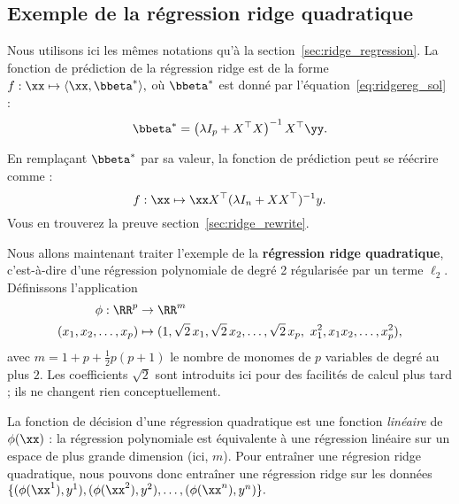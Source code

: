\subsection{Exemple de la régression ridge quadratique}

Nous utilisons ici les mêmes notations qu'à la section~\ref{sec:ridge_regression}.
La fonction de prédiction de la régression ridge est de la forme
  $f: \xx \mapsto \langle \xx,  \bbeta^* \rangle,$
où $\bbeta^*$ est donné par l'équation~\eqref{eq:ridgereg_sol} :
\begin{equation}
  \label{eq:reg_ridge_beta}
  \bbeta^* =  \left( \lambda I_p + X^\top X  \right)^{-1} X^\top \yy.
\end{equation}
  
En remplaçant $\bbeta^*$ par sa valeur, la fonction de prédiction peut se réécrire comme :
\begin{equation}
  \label{eq:reg_ridge_2}
  f: \xx \mapsto \xx X^\top (\lambda I_n + XX^\top)^{-1} y.
\end{equation}
Vous en trouverez la preuve section~\ref{sec:ridge_rewrite}.


Nous allons maintenant traiter l'exemple de la \textbf{régression ridge
  quadratique}, c'est-à-dire d'une régression polynomiale de degré 2
régularisée par un terme $\ell_2$. 
Définissons l'application
\begin{equation*}
  \begin{split}
    \phi: \RR^p  & \to \RR^m \\
    (x_1, x_2, \dots, x_p) & \mapsto (1, \sqrt{2}\,x_1, \sqrt{2}\, x_2, \dots,
    \sqrt{2}\, x_p,~x_1^2, x_1 x_2, \dots, x_p^2),
  \end{split}
\end{equation*}
avec $m = 1+ p + \frac12 p(p+1)$ le nombre de monomes de $p$ variables de degré
au plus $2$.  Les coefficients $\sqrt{2}$ sont introduits ici pour des
facilités de calcul plus tard ; ils ne changent rien conceptuellement.

La fonction de décision d'une régression quadratique est une fonction
\textit{linéaire} de $\phi(\xx)$ : la régression polynomiale est équivalente à
une régression linéaire sur un espace de plus grande dimension (ici, $m$).  
Pour entraîner une régresion ridge quadratique, nous pouvons donc entraîner une
régression ridge sur les données $\{(\phi(\xx^1), y^1), (\phi(\xx^2), y^2), \dots, (\phi(\xx^n), y^n)\}.$


